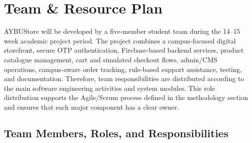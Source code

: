 \documentclass[11pt,a4paper]{article}
\begin{document}
\newpage


\section{Team \& Resource Plan}
\label{sec:team-resource-plan}

AYBUStore will be developed by a five-member student team during the
14--15 week academic project period. The project combines a campus-focused
digital storefront, secure OTP authentication, Firebase-based backend
services, product catalogue management, cart and simulated checkout flows,
admin/CMS operations, campus-aware order tracking, rule-based support
assistance, testing, and documentation. Therefore, team responsibilities
are distributed according to the main software engineering activities and
system modules. This role distribution supports the Agile/Scrum process
defined in the methodology section and ensures that each major component
has a clear owner.

\subsection{Team Members, Roles, and Responsibilities}
\end{document}
